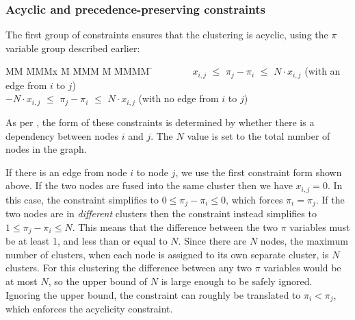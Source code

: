 

\subsubsection{Acyclic and precedence-preserving constraints}

The first group of constraints ensures that the clustering is acyclic, using the $\pi$ variable group described earlier:
\begin{tabbing}
MM  \= MMMx \= M \= MMM \= M \= MMMM \= \kill
    \> ~~~~~~~ $x_{i,j}$ \> $\le$ \> $\pi_j - \pi_i$ \> $\le$ \> $N \cdot x_{i,j}$ 
    \>             (with an edge from $i$ to $j$)            \\
    \> $-N \cdot  x_{i,j}$  \> $\le$ \> $\pi_j - \pi_i$ \> $\le$ \> $N \cdot x_{i,j}$ 
    \>             (with no edge from $i$ to $j$)
\end{tabbing}

As per \citet{megiddo1998optimal}, the form of these constraints is determined by whether there is a dependency between nodes $i$ and $j$.
The $N$ value is set to the total number of nodes in the graph.

If there is an edge from node $i$ to node $j$, we use the first constraint form shown above.
If the two nodes are fused into the same cluster then we have $x_{i,j} = 0$.
In this case, the constraint simplifies to $0 \le \pi_j - \pi_i \le 0$, which forces $\pi_i = \pi_j$.
If the two nodes are in \emph{different} clusters then the constraint instead simplifies to $1 \le \pi_j - \pi_i \le N$.
This means that the difference between the two $\pi$ variables must be at least 1, and less than or equal to $N$.
Since there are $N$ nodes, the maximum number of clusters, when each node is assigned to its own separate cluster, is $N$ clusters.
For this clustering the difference between any two $\pi$ variables would be at most $N$, so the upper bound of $N$ is large enough to be safely ignored.
Ignoring the upper bound, the constraint can roughly be translated to $\pi_i < \pi_j$, which enforces the acyclicity constraint.


